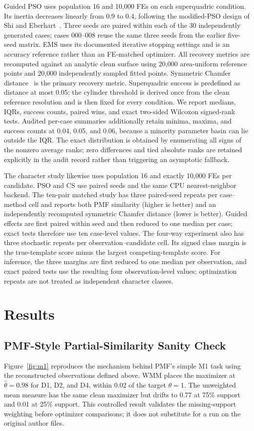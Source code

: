 \documentclass[conference]{IEEEtran}
\begin{document}
Guided PSO uses population 16 and 10,000 FEs on each superquadric condition.
Its inertia decreases linearly from 0.9 to 0.4, following the modified-PSO
design of Shi and Eberhart~\cite{shi1998modified}.
Three seeds are paired within each of the 30 independently generated cases;
cases 000--008 reuse the same three seeds from the earlier five-seed matrix.
EMS uses its documented
iterative stopping settings and is an accuracy reference rather than an
FE-matched optimizer.  All recovery metrics are recomputed against an analytic
clean surface using 20,000 area-uniform reference points and 20,000 independently
sampled fitted points.  Symmetric Chamfer distance~\cite{fan2017pointset} is
the primary recovery metric.  Superquadric success is predefined as distance
at most 0.05; the cylinder threshold is derived once from the clean reference
resolution and is then fixed for every condition.  We report medians, IQRs,
success counts, paired wins, and exact two-sided Wilcoxon signed-rank tests.
Audited per-case summaries additionally retain minima, maxima, and success
counts at 0.04, 0.05, and 0.06, because a minority parameter basin can lie
outside the IQR.
The exact distribution is obtained by enumerating all signs of the nonzero
average ranks; zero differences and tied absolute ranks are retained explicitly
in the audit record rather than triggering an asymptotic fallback.

The character study likewise uses population 16 and exactly 10,000 FEs per
candidate.  PSO and CS use paired seeds and the same CPU nearest-neighbor
backend.  The ten-pair matched study has three paired-seed repeats per
case--method cell and reports both PMF similarity (higher is better) and an
independently recomputed symmetric Chamfer distance (lower is better).  Guided
effects are first paired within seed and then reduced to one median per case;
exact tests therefore use ten case-level values.  The four-way experiment also
has three stochastic repeats per observation--candidate cell.  Its signed class
margin is the true-template score minus the largest competing-template score.
For inference, the three margins are first reduced to one median per
observation, and exact paired tests use the resulting four observation-level
values; optimization repeats are not treated as independent character classes.

\FloatBarrier
\section{Results}
\subsection{PMF-Style Partial-Similarity Sanity Check}
Figure~\ref{fig:m1} reproduces the mechanism behind PMF's simple M1 task using
the reconstructed observations defined above.  WMM places the maximizer at
$\hat\theta=0.98$ for D1, D2, and D4, within 0.02 of the target
$\theta=1$.  The unweighted mean measure has the same clean maximizer but drifts
to 0.77 at 75\% support and 0.01 at 25\% support.  This controlled result
validates the missing-support weighting before optimizer comparisons; it does
not substitute for a run on the original author files.
\end{document}
